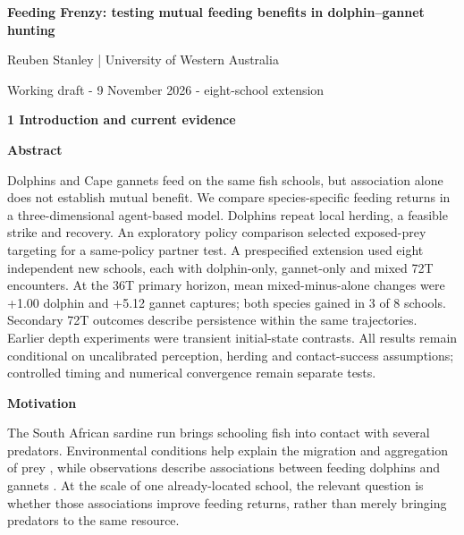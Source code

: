 \documentclass[10pt,a4paper]{article}
\begin{document}
\begin{center}{\LARGE\bfseries Feeding Frenzy: testing mutual feeding benefits in dolphin--gannet hunting\par}\vspace{6pt}Reuben Stanley | University of Western Australia\par{\small Working draft - 9 November 2026 - eight-school extension}\end{center}
{\large\bfseries 1 Introduction and current evidence\par}\vspace{7pt}
\begin{minipage}[t]{238.10999999999999pt}\vspace{0pt}
\textbf{Abstract}\par Dolphins and Cape gannets feed on the same fish schools, but association alone does not establish mutual benefit. We compare species-specific feeding returns in a three-dimensional agent-based model. Dolphins repeat local herding, a feasible strike and recovery. An exploratory policy comparison selected exposed-prey targeting for a same-policy partner test. A prespecified extension used eight independent new schools, each with dolphin-only, gannet-only and mixed 72T encounters. At the 36T primary horizon, mean mixed-minus-alone changes were +1.00 dolphin and +5.12 gannet captures; both species gained in 3 of 8 schools. Secondary 72T outcomes describe persistence within the same trajectories. Earlier depth experiments were transient initial-state contrasts. All results remain conditional on uncalibrated perception, herding and contact-success assumptions; controlled timing and numerical convergence remain separate tests.\par\smallskip
\textbf{Motivation}\par The South African sardine run brings schooling fish into contact with several predators. Environmental conditions help explain the migration and aggregation of prey \citep{teske2021}, while observations describe associations between feeding dolphins and gannets \citep{odonoghue2009}. At the scale of one already-located school, the relevant question is whether those associations improve feeding returns, rather than merely bringing predators to the same resource.\par\smallskip
\end{minipage}
\hfill
\end{document}
